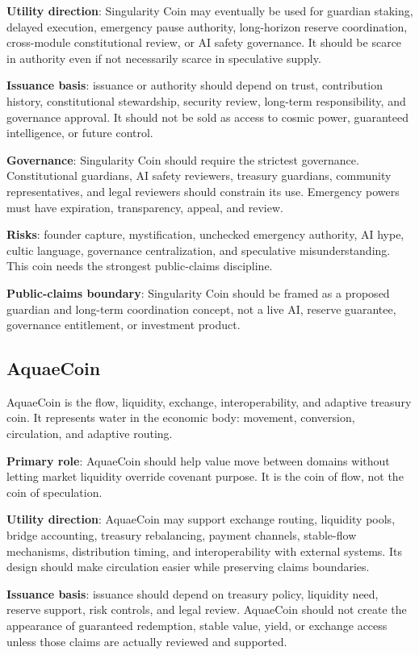\documentclass[12pt]{article}
\begin{document}
\textbf{Utility direction}: Singularity Coin may eventually be used for guardian staking, delayed execution, emergency pause authority, long-horizon reserve coordination, cross-module constitutional review, or AI safety governance. It should be scarce in authority even if not necessarily scarce in speculative supply.

\textbf{Issuance basis}: issuance or authority should depend on trust, contribution history, constitutional stewardship, security review, long-term responsibility, and governance approval. It should not be sold as access to cosmic power, guaranteed intelligence, or future control.

\textbf{Governance}: Singularity Coin should require the strictest governance. Constitutional guardians, AI safety reviewers, treasury guardians, community representatives, and legal reviewers should constrain its use. Emergency powers must have expiration, transparency, appeal, and review.

\textbf{Risks}: founder capture, mystification, unchecked emergency authority, AI hype, cultic language, governance centralization, and speculative misunderstanding. This coin needs the strongest public-claims discipline.

\textbf{Public-claims boundary}: Singularity Coin should be framed as a proposed guardian and long-term coordination concept, not a live AI, reserve guarantee, governance entitlement, or investment product.

\subsection{AquaeCoin}

AquaeCoin is the flow, liquidity, exchange, interoperability, and adaptive treasury coin. It represents water in the economic body: movement, conversion, circulation, and adaptive routing.

\textbf{Primary role}: AquaeCoin should help value move between domains without letting market liquidity override covenant purpose. It is the coin of flow, not the coin of speculation.

\textbf{Utility direction}: AquaeCoin may support exchange routing, liquidity pools, bridge accounting, treasury rebalancing, payment channels, stable-flow mechanisms, distribution timing, and interoperability with external systems. Its design should make circulation easier while preserving claims boundaries.

\textbf{Issuance basis}: issuance should depend on treasury policy, liquidity need, reserve support, risk controls, and legal review. AquaeCoin should not create the appearance of guaranteed redemption, stable value, yield, or exchange access unless those claims are actually reviewed and supported.
\end{document}
